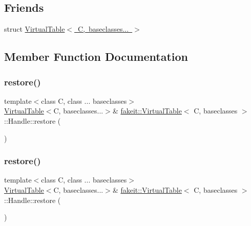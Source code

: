 \subsection*{Friends}
\begin{DoxyCompactItemize}
\item 
struct \mbox{\hyperlink{classfakeit_1_1VirtualTable_1_1Handle_a21a2c844059fe83d00ba9c9e4c3c977b}{Virtual\+Table$<$ C, baseclasses... $>$}}
\end{DoxyCompactItemize}


\subsection{Member Function Documentation}
\mbox{\label{classfakeit_1_1VirtualTable_1_1Handle_a7699fad7498aa96410a3657085100b39}} 
\subsubsection{\texorpdfstring{restore()}{restore()}\hspace{0.1cm}{\footnotesize\ttfamily [1/10]}}
{\footnotesize\ttfamily template$<$class C, class ... baseclasses$>$ \\
\mbox{\hyperlink{structfakeit_1_1VirtualTable}{Virtual\+Table}}$<$C, baseclasses...$>$\& \mbox{\hyperlink{structfakeit_1_1VirtualTable}{fakeit\+::\+Virtual\+Table}}$<$ C, baseclasses $>$\+::Handle\+::restore (\begin{DoxyParamCaption}{ }\end{DoxyParamCaption})\hspace{0.3cm}{\ttfamily [inline]}}

\mbox{\label{classfakeit_1_1VirtualTable_1_1Handle_a7699fad7498aa96410a3657085100b39}} 
\subsubsection{\texorpdfstring{restore()}{restore()}\hspace{0.1cm}{\footnotesize\ttfamily [2/10]}}
{\footnotesize\ttfamily template$<$class C, class ... baseclasses$>$ \\
\mbox{\hyperlink{structfakeit_1_1VirtualTable}{Virtual\+Table}}$<$C, baseclasses...$>$\& \mbox{\hyperlink{structfakeit_1_1VirtualTable}{fakeit\+::\+Virtual\+Table}}$<$ C, baseclasses $>$\+::Handle\+::restore (\begin{DoxyParamCaption}{ }\end{DoxyParamCaption})\hspace{0.3cm}{\ttfamily [inline]}}

